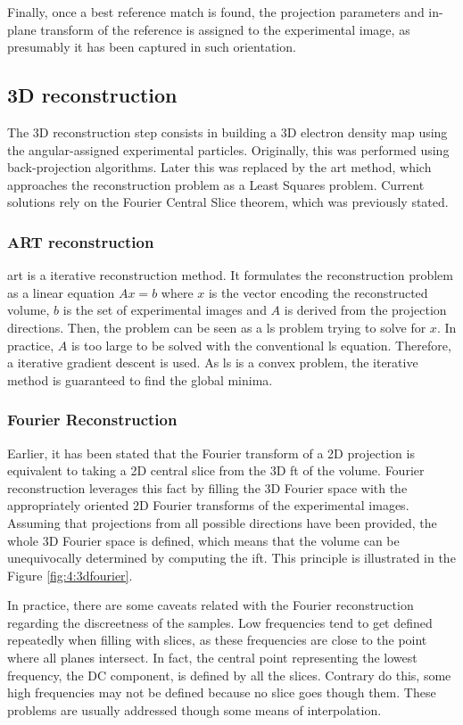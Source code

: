 \documentclass[../main.tex]{subfiles}
\begin{document}
Finally, once a best reference match is found, the projection parameters and in-plane transform of the reference is assigned to the experimental image, as presumably it has been captured in such orientation.

\subsection{3D reconstruction}
The 3D reconstruction step consists in building a 3D electron density map using the angular-assigned experimental particles. Originally, this was performed using back-projection algorithms. Later this was replaced by the \gls{art} method, which approaches the reconstruction problem as a Least Squares problem. Current solutions rely on the Fourier Central Slice theorem, which was previously stated.

\subsubsection{ART reconstruction}
\Gls{art} is a iterative reconstruction method. It formulates the reconstruction problem as a linear equation $Ax = b$ where $x$ is the vector encoding the reconstructed volume, $b$ is the set of experimental images and $A$ is derived from the projection directions. Then, the problem can be seen as a \gls{ls} problem\cite{kak2001} trying to solve for $x$. In practice, $A$ is too large to be solved with the conventional \gls{ls} equation. Therefore, a iterative gradient descent is used. As \gls{ls} is a convex problem, the iterative method is guaranteed to find the global minima\cite{nikazad2008}\cite{sorzano2017b}.

\subsubsection{Fourier Reconstruction}
Earlier, it has been stated that the Fourier transform of a 2D projection is equivalent to taking a 2D central slice from the 3D \gls{ft} of the volume. Fourier reconstruction leverages this fact by filling the 3D Fourier space with the appropriately oriented 2D Fourier transforms of the experimental images. Assuming that projections from all possible directions have been provided, the whole 3D Fourier space is defined, which means that the volume can be unequivocally determined by computing the \gls{ift}. This principle is illustrated in the Figure \ref{fig:4:3dfourier}\cite{sorzano2017b}.

In practice, there are some caveats related with the Fourier reconstruction regarding the discreetness of the samples. Low frequencies tend to get defined repeatedly when filling with slices, as these frequencies are close to the point where all planes intersect. In fact, the central point representing the lowest frequency, the DC component, is defined by all the slices. Contrary do this, some high frequencies may not be defined because no slice goes though them. These problems are usually addressed though some means of interpolation.
\end{document}
